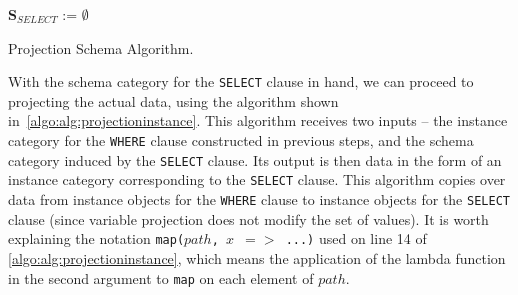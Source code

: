 \begin{algorithm}[ht]
\small
\DontPrintSemicolon
{}


$\mathbf{S}_{SELECT}$ := $\emptyset$


\caption{Projection Schema Algorithm.}
\label{algo:alg:projectionschema}
\end{algorithm}

With the schema category for the \texttt{SELECT} clause in hand, we can proceed to projecting the actual data, using the algorithm shown in~\cref{algo:alg:projectioninstance}.
This algorithm receives two inputs -- the instance category for the \texttt{WHERE} clause constructed in previous steps, and the schema category induced by the \texttt{SELECT} clause.
Its output is then data in the form of an instance category corresponding to the \texttt{SELECT} clause.
This algorithm copies over data from instance objects for the \texttt{WHERE} clause to instance objects for the \texttt{SELECT} clause (since variable projection does not modify the set of values).
It is worth explaining the notation \texttt{map($path$, $x$ $=>$ ...)} used on line 14 of \cref{algo:alg:projectioninstance}, which means the application of the lambda function in the second argument to \texttt{map} on each element of \texttt{$path$}.

